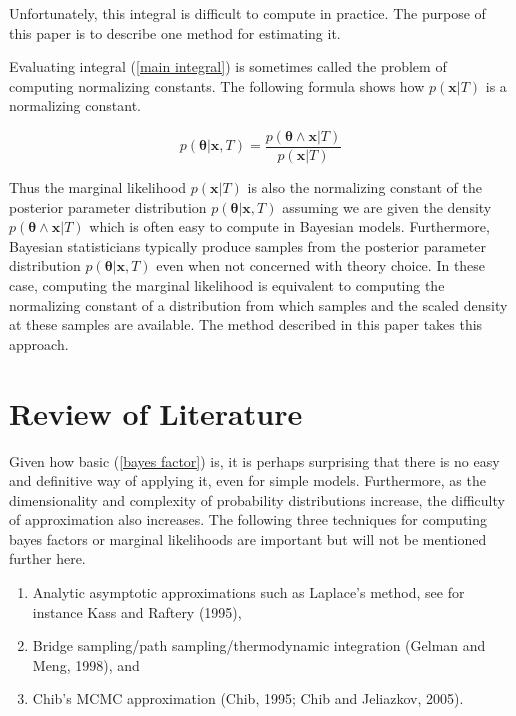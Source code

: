 \documentclass[letterpaper,12pt]{article}
\newcommand{\bx}{\boldsymbol x}
\newcommand{\btheta}{\boldsymbol \theta}
\begin{document}
\noindent Unfortunately, this integral is difficult to compute in
practice.  The purpose of this paper is to describe one method for
estimating it.

Evaluating integral (\ref{main integral}) is sometimes called the
problem of computing normalizing constants.  The following formula
shows how $p(\bx|T)$ is a normalizing constant.

\begin{equation}
  \label{norm constant}
  p(\btheta|\bx, T) = \frac{p(\btheta \wedge \bx|T)}{p(\bx|T)}
  \end{equation}

\noindent Thus the marginal likelihood $p(\bx|T)$ is also the
normalizing constant of the posterior parameter distribution
$p(\btheta|\bx, T)$ assuming we are given the density $p(\btheta
\wedge \bx|T)$ which is often easy to compute in Bayesian models.
Furthermore, Bayesian statisticians typically produce samples from the
posterior parameter distribution $p(\btheta|\bx, T)$ even when not
concerned with theory choice.  In these case, computing the marginal
likelihood is equivalent to computing the normalizing constant of a
distribution from which samples and the scaled density at these
samples are available. The method described in this paper takes this
approach.


\section{Review of Literature}
\label{lit review}

Given how basic (\ref{bayes factor}) is, it is perhaps surprising that
there is no easy and definitive way of applying it, even for simple
models.  Furthermore, as the dimensionality and complexity of
probability distributions increase, the difficulty of approximation
also increases.  The following three techniques for computing bayes
factors or marginal likelihoods are important but will not be
mentioned further here.

\begin{enumerate}
  \item Analytic asymptotic approximations such as Laplace's method,
    see for instance Kass and Raftery (1995),
  \item Bridge sampling/path sampling/thermodynamic integration
    (Gelman and Meng, 1998), and
  \item Chib's MCMC approximation (Chib, 1995; Chib and Jeliazkov, 2005).
\end{enumerate}
\end{document}
